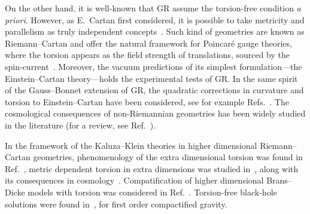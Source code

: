 \documentclass[aps,prd,12pt,superscriptaddress,showpacs,showkeys,longbibliography,reprint,nofootinbib]{revtex4-1}
\begin{document}
On the other hand, it is well-known that GR assume the torsion-free
condition {\it a priori}. However, as E.~Cartan first considered, it
is possible to take metricity and parallelism as truly independent
concepts~\cite{Cartan1922,*Cartan1924,*Cartan1925}. Such kind of
geometries are known as Riemann--Cartan and offer the natural
framework for Poincar\'e gauge theories, where the torsion appears as
the field strength of translations, sourced by the
spin-current~\cite{Kibble:1961ba,Sciama:1962,Hehl:1976kj}.
Moreover, the vacuum predictions of its simplest formulation---the
Einstein--Cartan theory---holds the experimental tests of GR. In the
same spirit of the Gauss--Bonnet extension of GR, the quadratic
corrections in curvature and torsion to Einstein--Cartan have been
considered, see for example Refs.~\cite{Baekler:2011jt,Fabbri:2012qr}.
The cosmological consequences of non-Riemannian geometries has been
widely studied in the literature (for a review, see
Ref.~\cite{Puetzfeld:2004yg}).

In the framework of the Kaluza--Klein theories in higher dimensional
Riemann--Cartan geometries, phenomenology of the extra dimensional
torsion was found in Ref.~\cite{Kalinowski:1980da}, metric dependent
torsion in extra dimensions was studied in~\cite{Shankar:2012vd},
along with its consequences in
cosmology~\cite{Chen:2009ep}. Compatification of higher dimensional
Brans--Dicke models with torsion was considered in
Ref.~\cite{German:1993bq}. Torsion-free black-hole solutions were
found in~\cite{Aros:2007nn}, for first order compactified gravity.
\end{document}
